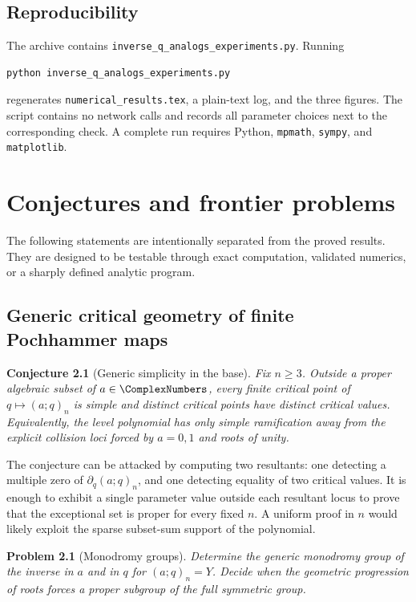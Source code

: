 \documentclass[11pt,a4paper,oneside,openany]{book}
\newtheorem{conjecture}[theorem]{Conjecture}
\newtheorem{problem}[theorem]{Problem}
\theoremstyle{definition}
\theoremstyle{remark}
\begin{document}
\section{Reproducibility}

The archive contains \texttt{inverse\_q\_analogs\_experiments.py}.  Running
\begin{lstlisting}[style=pythonstyle]
python inverse_q_analogs_experiments.py
\end{lstlisting}
regenerates \texttt{numerical\_results.tex}, a plain-text log, and the three
figures.  The script contains no network calls and records all parameter
choices next to the corresponding check.  A complete run requires Python,
\texttt{mpmath}, \texttt{sympy}, and \texttt{matplotlib}.

\chapter{Conjectures and frontier problems}

The following statements are intentionally separated from the proved
results.  They are designed to be testable through exact computation,
validated numerics, or a sharply defined analytic program.

\section{Generic critical geometry of finite Pochhammer maps}

\begin{conjecture}[Generic simplicity in the base]\label{conj:generic-simple-qcritical}
Fix \(n\ge3\).  Outside a proper algebraic subset of \(a\in\ComplexNumbers\), every finite
critical point of \(q\mapsto(a;q)_n\) is simple and distinct critical points
have distinct critical values.  Equivalently, the level polynomial has only
simple ramification away from the explicit collision loci forced by
\(a=0,1\) and roots of unity.
\end{conjecture}

The conjecture can be attacked by computing two resultants: one detecting a
multiple zero of \(\partial_q(a;q)_n\), and one detecting equality of two
critical values.  It is enough to exhibit a single parameter value outside
each resultant locus to prove that the exceptional set is proper for every
fixed \(n\).  A uniform proof in \(n\) would likely exploit the sparse
subset-sum support of the polynomial.

\begin{problem}[Monodromy groups]
Determine the generic monodromy group of the inverse in \(a\) and in \(q\)
for \((a;q)_n=Y\).  Decide when the geometric progression of roots forces a
proper subgroup of the full symmetric group.
\end{problem}
\end{document}
